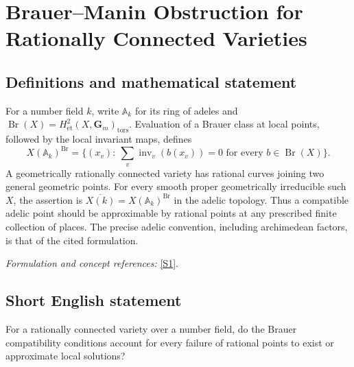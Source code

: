 \documentclass[11pt]{article}
\newcommand{\A}{\mathbb{A}}
\newcommand{\sref}[2]{\hyperlink{source:#1:#2}{[S#2]}}
\newif\ifshowcatalogue
\newcommand{\cataloguescope}[1]{\ifshowcatalogue
 \paragraph{Exact scope in the supplied catalogue.}
 \begin{quote}\small #1\end{quote}\fi}
\begin{document}
\setcounter{section}{0}
\clearpage
\section*{\texorpdfstring{Brauer–Manin Obstruction for Rationally Connected Varieties}{Brauer–Manin Obstruction for Rationally Connected Varieties}}\label{statement}
\subsection{Definitions and mathematical statement}
For a number field $k$, write $\A_k$ for its ring of adeles and $\operatorname{Br}(X)=H^2_{\mathrm{et}}(X,\mathbf G_m)_{\mathrm{tors}}$. Evaluation of a Brauer class at local points, followed by the local invariant maps, defines
\[
 X(\A_k)^{\operatorname{Br}}=\{(x_v):\ \sum_v\operatorname{inv}_v(b(x_v))=0\text{ for every }b\in\operatorname{Br}(X)\}.
\]
A geometrically rationally connected variety has rational curves joining two general geometric points. For every smooth proper geometrically irreducible such $X$, the assertion is
$\overline{X(k)}=X(\A_k)^{\operatorname{Br}}$ in the adelic topology. Thus a compatible adelic point should be approximable by rational points at any prescribed finite collection of places. The precise adelic convention, including archimedean factors, is that of the cited formulation.
\par\smallskip\textit{Formulation and concept references:} \sref{statement}{1}.
\cataloguescope{Let X be a smooth, proper, geometrically irreducible variety over a number field k whose base change to an algebraic closure is rationally connected. Prove that X(k) is dense in the Brauer-Manin set X(A\_k)\textasciicircum{}\{Br(X)\}; in particular the Brauer-Manin obstruction is the only obstruction to the Hasse principle and weak approximation for such varieties.}
\subsection{Short English statement}
For a rationally connected variety over a number field, do the Brauer compatibility conditions account for every failure of rational points to exist or approximate local solutions?
\end{document}
